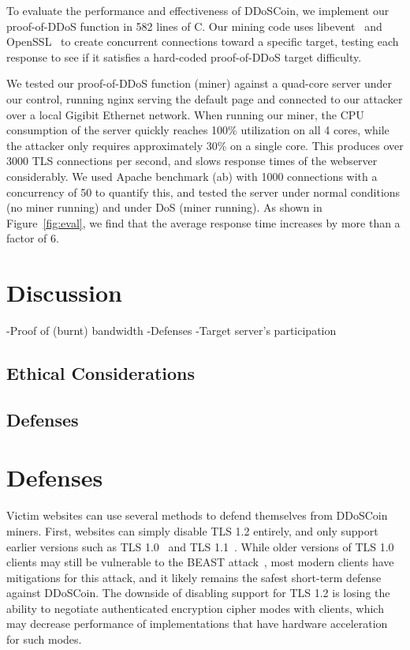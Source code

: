 \FigEval

To evaluate the performance and effectiveness of DDoSCoin, we implement our
proof-of-DDoS function in 582 lines of C. Our mining code uses
libevent~\cite{libevent} and OpenSSL~\cite{openssl} to create concurrent
connections toward a specific target, testing each response to see if it
satisfies a hard-coded proof-of-DDoS target difficulty.

We tested our proof-of-DDoS function (miner) against a quad-core server under
our control, running nginx serving the default page and connected to our
attacker over a local Gigibit Ethernet network. When running our miner, the CPU
consumption of the server quickly reaches 100\% utilization on all 4 cores,
while the attacker only requires approximately 30\% on a single core. This
produces over 3000 TLS connections per second, and slows response times of the
webserver considerably. We used Apache benchmark (ab) with 1000 connections with
a concurrency of 50 to quantify this, and tested the server under normal
conditions (no miner running) and under DoS (miner running). As shown in
Figure~\ref{fig:eval}, we find that the average response time increases by more
than a factor of 6.

\section{Discussion}

-Proof of (burnt) bandwidth
-Defenses
-Target server's participation

\subsection{Ethical Considerations}
\shrug


\subsection{Defenses}
\fi
\section{Defenses}

Victim websites can use several methods to defend themselves from
DDoSCoin miners. First, websites can simply disable TLS 1.2 entirely, and only
support earlier versions such as TLS 1.0~\cite{rfc2246} and TLS
1.1~\cite{rfc4346}. While older versions of
TLS 1.0 clients may still be vulnerable to the BEAST attack~\cite{beast}, most
modern clients have mitigations for this attack, and it likely remains the
safest short-term defense against DDoSCoin. The downside of disabling support
for TLS 1.2 is losing the ability to negotiate authenticated encryption cipher
modes with clients, which may decrease performance of implementations that have
hardware acceleration for such modes.


